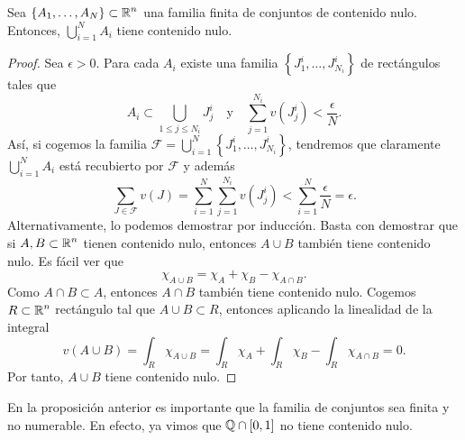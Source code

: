\begin{prop}
	Sea $\displaystyle \left\{ A_{1}, \ldots, A_{N}\right\} \subset \mathbb{R}^{n} $ una familia finita de conjuntos de contenido nulo. Entonces, $\displaystyle \bigcup_{i = 1}^{N}A_{i} $ tiene contenido nulo.
\end{prop}
\begin{proof}
Sea $\displaystyle \epsilon > 0 $. Para cada $\displaystyle A_{i} $ existe una familia $\displaystyle \left\{ J_{1}^{i}, \ldots, J_{N_{i}}^{i}\right\}  $ de rectángulos tales que 
	\[ A_{i} \subset \bigcup_{1 \leq j \leq N_{i}}J_{j}^{i} \quad \text{y} \quad \sum^{N_{i}}_{j = 1}v\left(J_{j}^{i}\right) < \frac{\epsilon }{N}.\]
	Así, si cogemos la familia $\displaystyle \mathcal{F}=\bigcup_{i = 1}^{N} \left\{ J^{i}_{1}, \ldots, J_{N_{i}}^{i}\right\}  $, tendremos que claramente $\displaystyle \bigcup_{i = 1}^{N}A_{i} $ está recubierto por $\displaystyle \mathcal{F} $ y además
	\[ \sum_{J \in \mathcal{F}}v\left(J\right) = \sum^{N}_{i = 1}\sum^{N_{i}}_{j = 1}v\left(J^{i}_{j}\right) < \sum^{N}_{i = 1}\frac{\epsilon }{N} = \epsilon  .\]
	Alternativamente, lo podemos demostrar por inducción. Basta con demostrar que si $\displaystyle A, B \subset \mathbb{R}^{n} $ tienen contenido nulo, entonces $\displaystyle A \cup B $ también tiene contenido nulo. Es fácil ver que 
	\[\chi_{A \cup B}=\chi_{A} + \chi_{B} -\chi_{A \cap B} .\]
	Como $\displaystyle A \cap B \subset A $, entonces $\displaystyle A\cap B $ también tiene contenido nulo. Cogemos $\displaystyle R \subset \mathbb{R}^{n} $ rectángulo tal que $\displaystyle A \cup B \subset R $, entonces aplicando la linealidad de la integral
	\[v\left(A \cup B\right)=\int _{R}\chi_{A \cup B} = \int _{R}\chi_{A} +\int _{R}\chi_{B} -\int _{R}\chi_{A \cap B} = 0 .\]
	Por tanto, $\displaystyle A \cup B $ tiene contenido nulo.
\end{proof}

\begin{observation}
	En la proposición anterior es importante que la familia de conjuntos sea finita y no numerable. En efecto, ya vimos que $\displaystyle \mathbb{Q} \cap [0,1]$  no tiene contenido nulo.
\end{observation}

